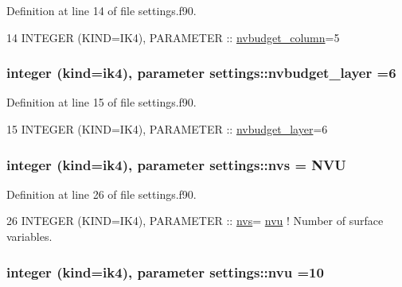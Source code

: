 Definition at line 14 of file settings.\+f90.


\begin{DoxyCode}
14 \textcolor{keywordtype}{INTEGER (KIND=IK4)}, \textcolor{keywordtype}{PARAMETER}   :: \hyperlink{namespacesettings_a78876a80ce867f4bc71866b783b6de89}{nvbudget\_column}=5
\end{DoxyCode}
\subsubsection[{\texorpdfstring{nvbudget\+\_\+layer}{nvbudget_layer}}]{\setlength{\rightskip}{0pt plus 5cm}integer (kind=ik4), parameter settings\+::nvbudget\+\_\+layer =6}\hypertarget{namespacesettings_a42675226258d1641f557f9e8e756b76e}{}\label{namespacesettings_a42675226258d1641f557f9e8e756b76e}


Definition at line 15 of file settings.\+f90.


\begin{DoxyCode}
15 \textcolor{keywordtype}{INTEGER (KIND=IK4)}, \textcolor{keywordtype}{PARAMETER}   :: \hyperlink{namespacesettings_a42675226258d1641f557f9e8e756b76e}{nvbudget\_layer}=6
\end{DoxyCode}
\subsubsection[{\texorpdfstring{nvs}{nvs}}]{\setlength{\rightskip}{0pt plus 5cm}integer (kind=ik4), parameter settings\+::nvs = N\+VU}\hypertarget{namespacesettings_ac10106479d8b3db1c5edd195b8dbf36e}{}\label{namespacesettings_ac10106479d8b3db1c5edd195b8dbf36e}


Definition at line 26 of file settings.\+f90.


\begin{DoxyCode}
26 \textcolor{keywordtype}{INTEGER (KIND=IK4)}, \textcolor{keywordtype}{PARAMETER}   :: \hyperlink{namespacesettings_ac10106479d8b3db1c5edd195b8dbf36e}{nvs}= \hyperlink{namespacesettings_a79e2ff19d589b215ed9176906dd5cbbf}{nvu}                 \textcolor{comment}{! Number of surface variables.}
\end{DoxyCode}
\subsubsection[{\texorpdfstring{nvu}{nvu}}]{\setlength{\rightskip}{0pt plus 5cm}integer (kind=ik4), parameter settings\+::nvu =10}\hypertarget{namespacesettings_a79e2ff19d589b215ed9176906dd5cbbf}{}\label{namespacesettings_a79e2ff19d589b215ed9176906dd5cbbf}


